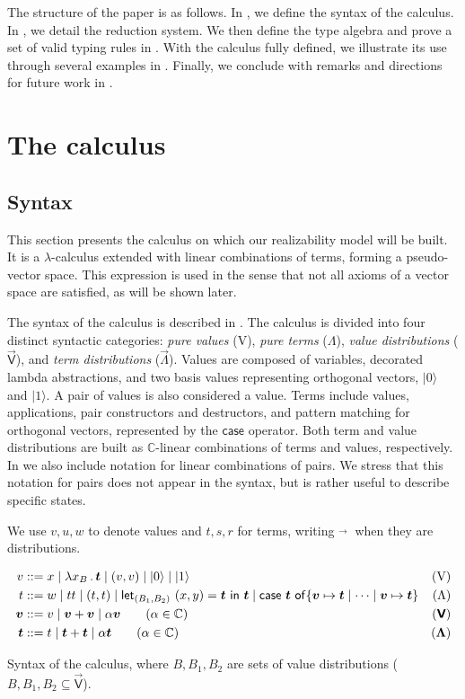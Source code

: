 \documentclass[runningheads,orivec,envcountsame,envcountsect]{llncs}
\newcommand\ket[1]{\ensuremath{|#1\rangle}}
\newcommand\s[1]{\ensuremath{\mathsf{#1}}}
\newcommand\Val{{\s V}}
\newcommand\ValD{\vec{\s V}}
\def\C{\mathbb{C}}            %
\def\Val{\mathrm{V}}          %
\def\Pair#1#2{(#1,#2)} %
\def\Lam#1#2#3{\lambda#1_{#2}\,{.}\,#3} %
\def\letkeyword{\mathsf{let}}
\def\inkeyword{\mathsf{in}}
\def\LetP#1#2#3#4#5#6{\letkeyword_{\Pair{#2}{#4}}~\Pair{#1}{#3}=#5~\inkeyword~#6}
\def\gencase#1#2#3#4#5{\ensuremath{\mathsf{case}~#1~\mathsf{of} \{#2\mapsto #4 \mid \dotsb \mid #3\mapsto #5\}}}
\begin{document}
The structure of the paper is as follows. In , we
define the syntax of the calculus. In , we detail
the reduction system. We then define the type algebra and prove a set of valid
typing rules in . With the calculus fully defined, we
illustrate its use through several examples in .
Finally, we conclude with remarks and directions for future work in
.

\section{The calculus}\label{sec:calculus}
\subsection{Syntax}

This section presents the calculus on which our realizability model will be
built. It is a $\lambda$-calculus extended with linear combinations of terms,
forming a pseudo-vector space. This expression is used in the sense that not
all axioms of a vector space are satisfied, as will be shown later.

The syntax of the calculus is described in
. The calculus is divided into four
distinct syntactic categories: \emph{pure values} ($\Val$), \emph{pure terms}
($\Lambda$), \emph{value distributions} ($\ValD$), and \emph{term
distributions} ($\vec\Lambda$). Values are composed of variables, decorated
lambda abstractions, and two basis values representing orthogonal vectors,
$\ket 0$ and $\ket 1$. A pair of values is also considered a value.  Terms
include values, applications, pair constructors and destructors, and pattern
matching for orthogonal vectors, represented by the $\mathsf{case}$ operator.
Both term and value distributions are built as $\C$-linear combinations of
terms and values, respectively. In 
we also include notation for linear combinations of
pairs. We stress that this notation for pairs does not appear in the syntax,
but is rather useful to describe specific states.

We use $v,u,w$ to denote values and $t,s,r$ for terms, writing $\vec{}\;$ when
they are distributions.

\begin{table*}[t]
  \begin{align*}
    v &::= x \mid \Lam{x}B{\vec{t}} \mid (v, v) \mid \ket{0} \mid \ket{1} &
    (\Val)\\
    t &::= w \mid tt \mid (t,t) \mid
    \LetP{x}{B_1}{y}{B_2}{\vec{t}}{\vec{t}}\mid
    \gencase{\vec{t}}{\vec{v}}{\vec{v}}{\vec{t}}{\vec{t}} &
    (\Lambda) \\
    \vec{v} &::= v \mid \vec{v}+\vec{v} \mid \alpha \vec{v}
    \qquad\hfill(\alpha\in\C) & (\ValD) \\
    \vec{t} &::= t \mid \vec{t}+\vec{t} \mid \alpha \vec{t}
    \qquad\hfill(\alpha\in\C) & (\vec \Lambda)
  \end{align*}
  \caption{Syntax of the calculus, where $B, B_1, B_2$ are sets of value
  distributions ($B, B_1, B_2 \subseteq \ValD$).}
  \label{tab:Syntax}
\end{table*}
\end{document}
